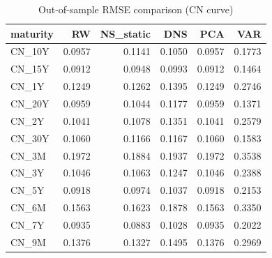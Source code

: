 \begin{table}
\caption{Out-of-sample RMSE comparison (CN curve)}
\label{tab:6_3_cn}
\begin{tabular}{lrrrrr}
\toprule
maturity & RW & NS_static & DNS & PCA & VAR \\
\midrule
CN_10Y & 0.0957 & 0.1141 & 0.1050 & 0.0957 & 0.1773 \\
CN_15Y & 0.0912 & 0.0948 & 0.0993 & 0.0912 & 0.1464 \\
CN_1Y & 0.1249 & 0.1262 & 0.1395 & 0.1249 & 0.2746 \\
CN_20Y & 0.0959 & 0.1044 & 0.1177 & 0.0959 & 0.1371 \\
CN_2Y & 0.1041 & 0.1078 & 0.1351 & 0.1041 & 0.2579 \\
CN_30Y & 0.1060 & 0.1166 & 0.1167 & 0.1060 & 0.1583 \\
CN_3M & 0.1972 & 0.1884 & 0.1937 & 0.1972 & 0.3538 \\
CN_3Y & 0.1046 & 0.1063 & 0.1247 & 0.1046 & 0.2388 \\
CN_5Y & 0.0918 & 0.0974 & 0.1037 & 0.0918 & 0.2153 \\
CN_6M & 0.1563 & 0.1623 & 0.1878 & 0.1563 & 0.3350 \\
CN_7Y & 0.0935 & 0.0883 & 0.1028 & 0.0935 & 0.2022 \\
CN_9M & 0.1376 & 0.1327 & 0.1495 & 0.1376 & 0.2969 \\
\bottomrule
\end{tabular}
\end{table}
